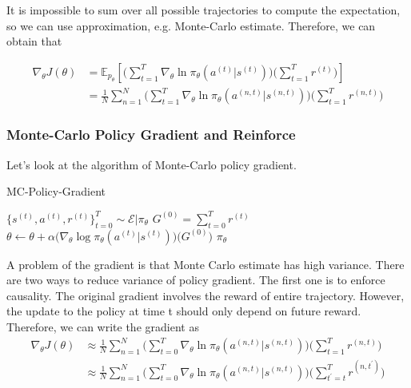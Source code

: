 \documentclass[11pt]{article}
\begin{document}
It is impossible to sum over all possible trajectories to compute the expectation, so we can use approximation, e.g. Monte-Carlo estimate. Therefore, we can obtain that

\begin{align*}
    \nabla_\theta J(\theta) & = \mathbb{E}_{p_\theta}\left[ \Bigg( \sum_{t=1}^T \nabla_\theta \ln \pi_\theta(a^{(t)}|s^{(t)}) \Bigg) \Bigg( \sum_{t=1}^T r^{(t)} \Bigg) \right] \\
    & = \frac{1}{N}\sum_{n=1}^N \Bigg( \sum_{t=1}^T \nabla_\theta \ln \pi_\theta(a^{(n, t)}|s^{(n, t)}) \Bigg) \Bigg( \sum_{t=1}^T r^{(n, t)} \Bigg)
\end{align*}

\subsubsection{Monte-Carlo Policy Gradient and Reinforce}
Let's look at the algorithm of Monte-Carlo policy gradient.
\begin{algorithm}[H]
\caption{MC-Policy-Gradient}
\begin{algorithmic}[1]
\STATE $\{s^{(t)}, a^{(t)}, r^{(t)}\}_{t=0}^T \sim \mathcal{E}|\pi_\theta$
\STATE $G^{(0)} = \sum_{t=0}^T r^{(t)}$ 
\STATE $\theta \leftarrow \theta + \alpha \Big( \nabla_\theta \log \pi_\theta (a^{(t)}|s^{(t)}) \Big) \Big( G^{(0)} \Big) $
\ENDFOR
\ENDFOR
\RETURN $\pi_\theta$
\end{algorithmic}
\end{algorithm}

A problem of the gradient is that Monte Carlo estimate has high variance. There are two ways to reduce variance of policy gradient. The first one is to enforce causality. The original gradient involves the reward of entire trajectory. However, the update to the policy at time t should only depend on future reward. Therefore, we can write the gradient as
\begin{align*}
    \nabla_\theta J(\theta) & \approx \frac{1}{N}\sum_{n=1}^N \Bigg( \sum_{t=0}^T \nabla_\theta \ln \pi_\theta(a^{(n, t)}|s^{(n, t)}) \Bigg) \Bigg( \sum_{t=1}^T r^{(n, t)} \Bigg) \\
    & \approx \frac{1}{N}\sum_{n=1}^N \Bigg( \sum_{t=0}^T \nabla_\theta \ln \pi_\theta(a^{(n, t)}|s^{(n, t)}) \Bigg) \Bigg( \sum_{t^{'}=t}^T r^{(n, t^{'})} \Bigg)
\end{align*}
\end{document}
